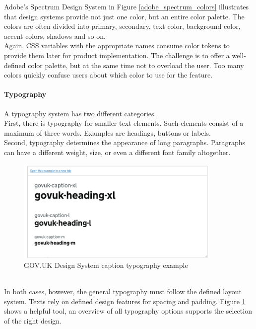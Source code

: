 Adobe's Spectrum Design System in Figure \ref{adobe_spectrum_colors} illustrates that design systems provide not just one color, but an entire color palette. The colors are often divided into primary, secondary, text color, background color, accent colors, shadows and so on. \\
Again, \ac{CSS} variables with the appropriate names consume color tokens to provide them later for product implementation. The challenge is to offer a well-defined color palette, but at the same time not to overload the user. Too many colors quickly confuse users about which color to use for the feature. \cite{vesselov_building_2019}

\paragraph{Typography}
A typography system has two different categories. \\
First, there is typography for smaller text elements. Such elements consist of a maximum of three words. Examples are headings, buttons or labels. \\
Second, typography determines the appearance of long paragraphs. Paragraphs can have a different weight, size, or even a different font family altogether.
\begin{figure}[hbtp]
	\centerline{\includegraphics[height=5cm]{images/gov_uk_typo.png}}
	\caption{GOV.UK Design System caption typography example \cite{govuk_govuk_nodate}}
	\label{gov_uk_typo}
\end{figure} \\
In both cases, however, the general typography must follow the defined layout system. Texts rely on defined design features for spacing and padding. Figure \ref{gov_uk_typo} shows a helpful tool, an overview of all typography options supports the selection of the right design.  \cite{vesselov_building_2019}



